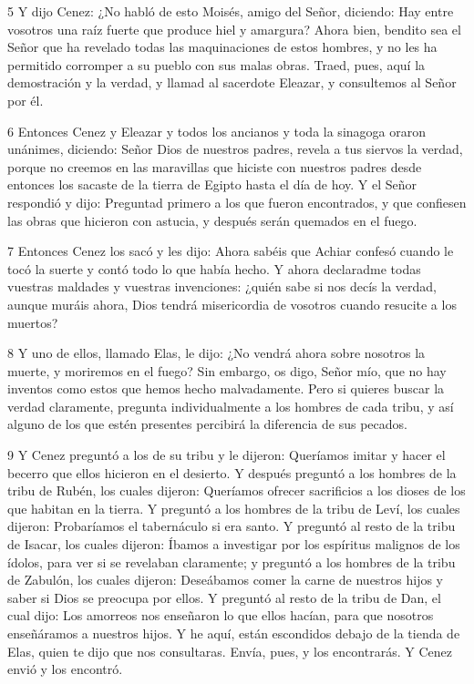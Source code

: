 \par 5 Y dijo Cenez: ¿No habló de esto Moisés, amigo del Señor, diciendo: Hay entre vosotros una raíz fuerte que produce hiel y amargura? Ahora bien, bendito sea el Señor que ha revelado todas las maquinaciones de estos hombres, y no les ha permitido corromper a su pueblo con sus malas obras. Traed, pues, aquí la demostración y la verdad, y llamad al sacerdote Eleazar, y consultemos al Señor por él.

\par 6 Entonces Cenez y Eleazar y todos los ancianos y toda la sinagoga oraron unánimes, diciendo: Señor Dios de nuestros padres, revela a tus siervos la verdad, porque no creemos en las maravillas que hiciste con nuestros padres desde entonces los sacaste de la tierra de Egipto hasta el día de hoy. Y el Señor respondió y dijo: Preguntad primero a los que fueron encontrados, y que confiesen las obras que hicieron con astucia, y después serán quemados en el fuego.

\par 7 Entonces Cenez los sacó y les dijo: Ahora sabéis que Achiar confesó cuando le tocó la suerte y contó todo lo que había hecho. Y ahora declaradme todas vuestras maldades y vuestras invenciones: ¿quién sabe si nos decís la verdad, aunque muráis ahora, Dios tendrá misericordia de vosotros cuando resucite a los muertos?

\par 8 Y uno de ellos, llamado Elas, le dijo: ¿No vendrá ahora sobre nosotros la muerte, y moriremos en el fuego? Sin embargo, os digo, Señor mío, que no hay inventos como estos que hemos hecho malvadamente. Pero si quieres buscar la verdad claramente, pregunta individualmente a los hombres de cada tribu, y así alguno de los que estén presentes percibirá la diferencia de sus pecados.

\par 9 Y Cenez preguntó a los de su tribu y le dijeron: Queríamos imitar y hacer el becerro que ellos hicieron en el desierto. Y después preguntó a los hombres de la tribu de Rubén, los cuales dijeron: Queríamos ofrecer sacrificios a los dioses de los que habitan en la tierra. Y preguntó a los hombres de la tribu de Leví, los cuales dijeron: Probaríamos el tabernáculo si era santo. Y preguntó al resto de la tribu de Isacar, los cuales dijeron: Íbamos a investigar por los espíritus malignos de los ídolos, para ver si se revelaban claramente; y preguntó a los hombres de la tribu de Zabulón, los cuales dijeron: Deseábamos comer la carne de nuestros hijos y saber si Dios se preocupa por ellos. Y preguntó al resto de la tribu de Dan, el cual dijo: Los amorreos nos enseñaron lo que ellos hacían, para que nosotros enseñáramos a nuestros hijos. Y he aquí, están escondidos debajo de la tienda de Elas, quien te dijo que nos consultaras. Envía, pues, y los encontrarás. Y Cenez envió y los encontró.

